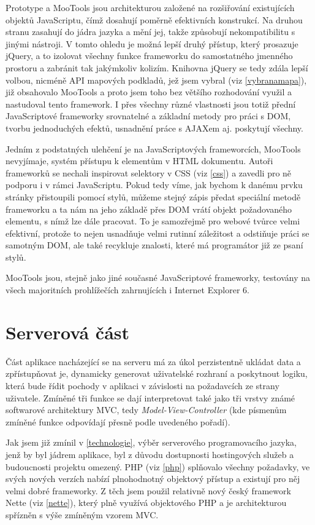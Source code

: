 Prototype a MooTools jsou architekturou založené na rozšiřování
existujících objektů JavaScriptu, čímž dosahují poměrně
efektivních konstrukcí. Na druhou stranu zasahují do jádra
jazyka a mění jej, takže způsobují nekompatibilitu s jinými nástroji.
V tomto ohledu je možná lepší druhý přístup, který prosazuje jQuery, a
to izolovat všechny funkce frameworku do samostatného jmenného
prostoru a zabránit tak jakýmkoliv kolizím. Knihovna jQuery se tedy
zdála lepší volbou, nicméně API mapových podkladů, jež jsem vybral
(viz \ref{vybranamapa}), již obsahovalo MooTools a proto jsem toho
bez většího rozhodování využil a nastudoval tento framework. I přes
všechny různé vlastnosti jsou totiž přední JavaScriptové frameworky
srovnatelné a základní metody pro práci s DOM, tvorbu jednoduchých
efektů, usnadnění práce s AJAXem aj. poskytují všechny.

Jedním z podstatných ulehčení je na JavaScriptových frameworcích,
MooTools nevyjímaje, systém přístupu k elementům v HTML dokumentu.
Autoři frameworků se nechali inspirovat selektory v CSS (viz
\ref{css}) a zavedli pro ně podporu i v rámci JavaScriptu. Pokud tedy víme, jak bychom k
danému prvku stránky přistoupili pomocí stylů, můžeme stejný zápis
předat speciální metodě frameworku a ta nám na jeho základě přes DOM
vrátí objekt požadovaného elementu, s nímž lze dále pracovat. To je
samozřejmě pro webové tvůrce velmi efektivní, protože to nejen usnadňuje velmi rutinní
záležitost a odstiňuje práci se samotným DOM, ale také recykluje
znalosti, které má programátor již ze psaní stylů.

MooTools jsou, stejně jako jiné současné JavaScriptové frameworky,
testovány na všech majoritních prohlížečích zahrnujících i Internet
Explorer 6.

\section{Serverová část}\label{mvc}
Část aplikace nacházející se na serveru má za úkol perzistentně
ukládat data a zpřístupňovat je, dynamicky generovat uživatelské
rozhraní a poskytnout logiku, která bude řídit pochody v aplikaci v
závislosti na požadavcích ze strany uživatele. Zmíněné tři funkce se
dají interpretovat také jako tři vrstvy známé softwarové architektury
MVC, tedy {\it Model-View-Controller} (kde písmenům zmíněné funkce
odpovídají přesně podle uvedeného pořadí). \cite{janTichy}

Jak jsem již zmínil v \ref{technologie}, výběr serverového
programovacího jazyka, jenž by byl jádrem aplikace, byl z důvodu
dostupnosti hostingových služeb a budoucnosti projektu omezený. PHP
(viz \ref{php}) splňovalo všechny požadavky, ve svých nových verzích
nabízí plnohodnotný objektový přístup a existují pro něj velmi dobré
frameworky. Z těch jsem použil relativně nový český framework Nette
(viz \ref{nette}), který plně využívá objektového PHP a je
architekturou spřízněn s výše zmíněným vzorem MVC.

